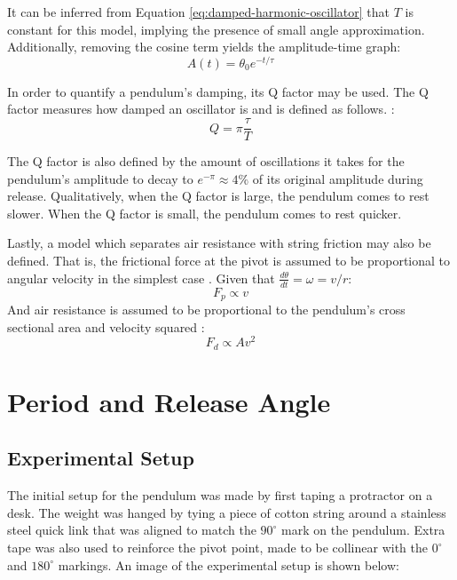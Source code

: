 \documentclass[11pt]{article}
\begin{document}
\begin{multicols}{2}
It can be inferred from Equation \ref{eq:damped-harmonic-oscillator} that $T$ is constant for this model, implying the presence of small angle approximation. Additionally, removing the cosine term yields the amplitude-time graph:
\begin{equation} \label{eq:amplitude-function}
    A(t) = \theta_0 e^{-{t/\tau}}
\end{equation}

In order to quantify a pendulum's damping, its Q factor may be used. The Q factor measures how damped an oscillator is and is defined as follows. \cite{pnp-physics}:
\begin{equation} \label{eq:q-factor-formula}
    Q = \pi\frac{\tau}{T}
\end{equation}

The Q factor is also defined by the amount of oscillations it takes for the pendulum's amplitude to decay to $e^{-\pi} \approx 4\%$ of its original amplitude during release. Qualitatively, when the Q factor is large, the pendulum comes to rest slower. When the Q factor is small, the pendulum comes to rest quicker.

Lastly, a model which separates air resistance with string friction may also be defined. That is, the frictional force at the pivot is assumed to be proportional to angular velocity in the simplest case \cite{duke-pendulum}. Given that $\frac{d\theta}{dt} = \omega = v/r$:
\begin{equation} \label{eq:propto v}
    F_p \propto v
\end{equation}
And air resistance is assumed to be proportional to the pendulum's cross sectional area and velocity squared \cite{airdrag}:
\begin{equation} \label{eq:propto v2}
    F_d \propto Av^2
\end{equation}

\section{Period and Release Angle} \label{sec 3 period and release angle}

\subsection{Experimental Setup}
The initial setup for the pendulum was made by first taping a protractor on a desk. The weight was hanged by tying a piece of cotton string around a stainless steel quick link that was aligned to match the $90^{\circ}$ mark on the pendulum. Extra tape was also used to reinforce the pivot point, made to be collinear with the $0^{\circ}$ and $180^{\circ}$ markings. An image of the experimental setup is shown below:


\end{multicols}
\end{document}
